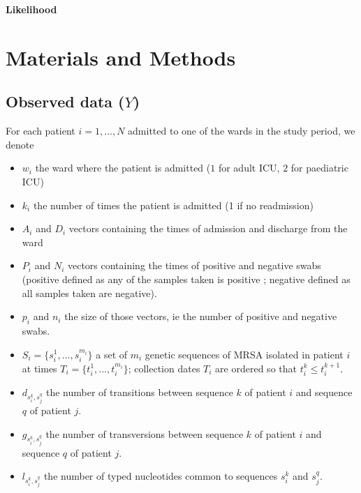 \documentclass[10pt]{article}
\begin{document}
{\Large
\textbf{Likelihood}
}
\\
\section*{Materials and Methods}

\subsection*{Observed data ($Y$)}

For each patient $i=1,\ldots,N$ admitted to one of the wards in the study period, we denote 
\begin{itemize}
	\item $w_i$ the ward where the patient is admitted ($1$ for adult ICU, $2$ for paediatric ICU)
	\item $k_i$ the number of times the patient is admitted (1 if no readmission)
	\item $A_i$ and $D_i$ vectors containing the times of admission and discharge from the ward
	\item $P_i$ and $N_i$ vectors containing the times of positive and negative swabs (positive defined as any of the samples taken is positive ; negative defined as all samples taken are negative).
	\item $p_i$ and $n_i$ the size of those vectors, ie the number of positive and negative swabs.
 	\item $S_i = \{s_i^1, \ldots, s_i^{m_i}\}$ a set of $m_i$ genetic sequences of MRSA isolated in patient $i$ at times 
$T_i = \{t_i^1, \ldots, t_i^{m_i}\}$; collection dates $T_i$ are ordered so that $t_i^k \leq t_i^{k+1}$.
 	\item $d_{s_i^k,s_j^q}$ the number of transitions between sequence $k$ of patient $i$ and sequence $q$ of patient $j$.
	\item $g_{s_i^k,s_j^q}$ the number of transversions between sequence $k$ of patient $i$ and sequence $q$ of patient $j$.
	\item $l_{s_i^k,s_j^q}$ the number of typed nucleotides common to sequences $s_i^k$ and $s_j^q$.
\end{itemize}
\end{document}

